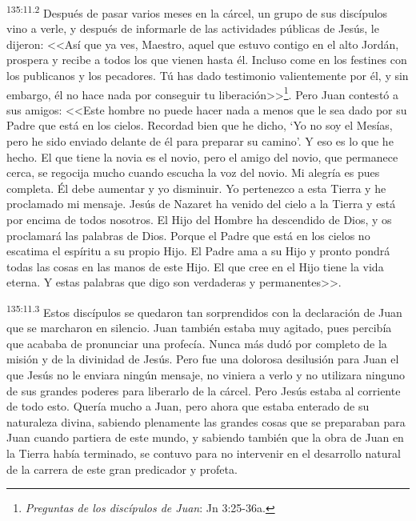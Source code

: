 \par 
\textsuperscript{135:11.2} Después de pasar varios meses en la cárcel, un grupo de sus discípulos vino a verle, y después de informarle de las actividades públicas de Jesús, le dijeron: <<Así que ya ves, Maestro, aquel que estuvo contigo en el alto Jordán, prospera y recibe a todos los que vienen hasta él. Incluso come en los festines con los publicanos y los pecadores. Tú has dado testimonio valientemente por él, y sin embargo, él no hace nada por conseguir tu liberación>>\footnote{\textit{Preguntas de los discípulos de Juan}: Jn 3:25-36a.}. Pero Juan contestó a sus amigos: <<Este hombre no puede hacer nada a menos que le sea dado por su Padre que está en los cielos. Recordad bien que he dicho, `Yo no soy el Mesías, pero he sido enviado delante de él para preparar su camino'. Y eso es lo que he hecho. El que tiene la novia es el novio, pero el amigo del novio, que permanece cerca, se regocija mucho cuando escucha la voz del novio. Mi alegría es pues completa. Él debe aumentar y yo disminuir. Yo pertenezco a esta Tierra y he proclamado mi mensaje. Jesús de Nazaret ha venido del cielo a la Tierra y está por encima de todos nosotros. El Hijo del Hombre ha descendido de Dios, y os proclamará las palabras de Dios. Porque el Padre que está en los cielos no escatima el espíritu a su propio Hijo. El Padre ama a su Hijo y pronto pondrá todas las cosas en las manos de este Hijo. El que cree en el Hijo tiene la vida eterna. Y estas palabras que digo son verdaderas y permanentes>>.

\par 
\textsuperscript{135:11.3} Estos discípulos se quedaron tan sorprendidos con la declaración de Juan que se marcharon en silencio. Juan también estaba muy agitado, pues percibía que acababa de pronunciar una profecía. Nunca más dudó por completo de la misión y de la divinidad de Jesús. Pero fue una dolorosa desilusión para Juan el que Jesús no le enviara ningún mensaje, no viniera a verlo y no utilizara ninguno de sus grandes poderes para liberarlo de la cárcel. Pero Jesús estaba al corriente de todo esto. Quería mucho a Juan, pero ahora que estaba enterado de su naturaleza divina, sabiendo plenamente las grandes cosas que se preparaban para Juan cuando partiera de este mundo, y sabiendo también que la obra de Juan en la Tierra había terminado, se contuvo para no intervenir en el desarrollo natural de la carrera de este gran predicador y profeta.

